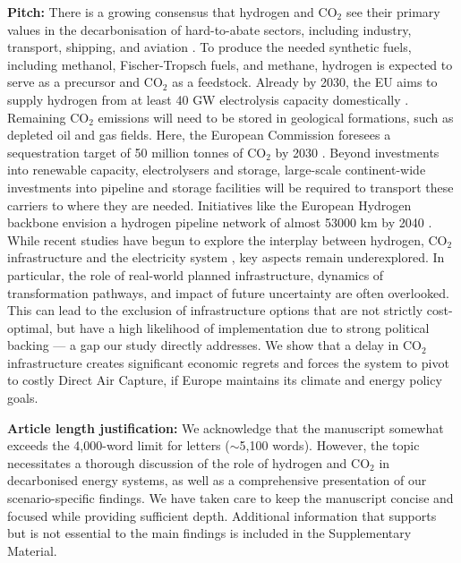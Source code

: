 \documentclass[10pt,a4paper,roman]{moderncv}        %
\begin{document}
\textbf{Pitch:} 
There is a growing consensus that hydrogen and CO$_2$ see their primary values in the decarbonisation of hard-to-abate sectors, including industry, transport, shipping, and aviation \cite{vangreevenbroekLittleLoseCase2025,reigstadMovingLowcarbonHydrogen2022,cerniauskasOptionsNaturalGas2020}. To produce the needed synthetic fuels, including methanol, Fischer-Tropsch fuels, and methane, hydrogen is expected to serve as a precursor and CO$_2$ as a feedstock. Already by 2030, the EU aims to supply hydrogen from at least 40 GW electrolysis capacity domestically \cite{europeancommissionCommunicationCommissionEuropean2020,europeancommissionREPowerEUPlanCommunication2022,europeanparliamentRegulationEU20242024}. Remaining CO$_2$ emissions will need to be stored in geological formations, such as depleted oil and gas fields. Here, the European Commission foresees a sequestration target of 50 million tonnes of CO$_2$ by 2030 \cite{europeancommissionREPowerEUPlanCommunication2022}. Beyond investments into renewable capacity, electrolysers and storage, large-scale continent-wide investments into pipeline and storage facilities will be required to transport these carriers to where they are needed. Initiatives like the European Hydrogen backbone envision a hydrogen pipeline network of almost 53000 km by 2040 \cite{europeanhydrogenbackboneinitiativeEuropeanHydrogenBackbone2022}. While recent studies have begun to explore the interplay between hydrogen, CO$_2$ infrastructure and the electricity system \cite{hofmannH2CO2Network2025,kountourisUnifiedEuropeanHydrogen2024,neumannPotentialRoleHydrogen2023,neumannGreenEnergySteel2025}, key aspects remain underexplored. In particular, the role of real-world planned infrastructure, dynamics of transformation pathways, and impact of future uncertainty are often overlooked. This can lead to the exclusion of infrastructure options that are not strictly cost-optimal, but have a high likelihood of implementation due to strong political backing \cite{trutnevyteDoesCostOptimization2016} --- a gap our study directly addresses. We show that a delay in CO$_2$ infrastructure creates significant economic regrets and forces the system to pivot to costly Direct Air Capture, if Europe maintains its climate and energy policy goals.

\textbf{Article length justification:}
We acknowledge that the manuscript somewhat exceeds the 4,000-word limit for letters ($\sim$5,100 words). However, the topic necessitates a thorough discussion of the role of hydrogen and CO$_2$ in decarbonised energy systems, as well as a comprehensive presentation of our scenario-specific findings. We have taken care to keep the manuscript concise and focused while providing sufficient depth. Additional information that supports but is not essential to the main findings is included in the Supplementary Material.
\end{document}
